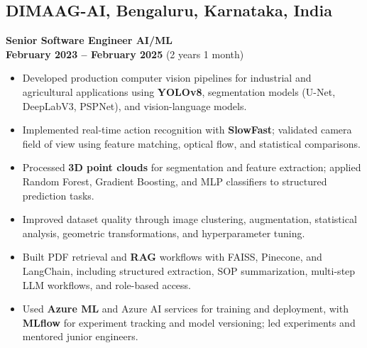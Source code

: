 \documentclass[a4paper,10pt]{article}
\begin{document}
\subsection{DIMAAG-AI, Bengaluru, Karnataka, India}
\textbf{Senior Software Engineer AI/ML} \\
\hfill \textbf{February 2023 -- February 2025} (2 years 1 month)
\begin{itemize}
\item Developed production computer vision pipelines for industrial and agricultural applications using \textbf{YOLOv8}, segmentation models (U-Net, DeepLabV3, PSPNet), and vision-language models.

\item Implemented real-time action recognition with \textbf{SlowFast}; validated camera field of view using feature matching, optical flow, and statistical comparisons.

\item Processed \textbf{3D point clouds} for segmentation and feature extraction; applied Random Forest, Gradient Boosting, and MLP classifiers to structured prediction tasks.

\item Improved dataset quality through image clustering, augmentation, statistical analysis, geometric transformations, and hyperparameter tuning.

\item Built PDF retrieval and \textbf{RAG} workflows with FAISS, Pinecone, and LangChain, including structured extraction, SOP summarization, multi-step LLM workflows, and role-based access.

\item Used \textbf{Azure ML} and Azure AI services for training and deployment, with \textbf{MLflow} for experiment tracking and model versioning; led experiments and mentored junior engineers.
\end{itemize}

	
\end{document}
